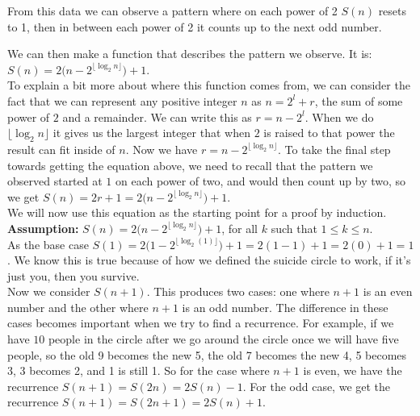 \documentclass[10pt, AMS Euler]{article}
\begin{document}
    \noindent From this data we can observe a pattern where on each power of 2 $S(n)$ resets to 1, then in between each power of 2 it counts up to the next odd number.

	\bigskip
	\noindent We can then make a function that describes the pattern we observe. It is: $S(n)=2\big(n-2^{\lfloor \log_2n\rfloor}\big)+1$.\\
    
    \noindent To explain a bit more about where this function comes from, we can consider the fact that we can represent any positive integer $n$ as $n=2^l+r$, the sum of some power of $2$ and a remainder. We can write this as $r=n-2^l$. When we do $\lfloor\log_2n\rfloor$ it gives us the largest integer that when $2$ is raised to that power the result can fit inside of $n$. Now we have $r=n-2^{\lfloor\log_2n\rfloor}$. To take the final step towards getting the equation above, we need to recall that the pattern we observed started at $1$ on each power of two, and would then count up by two, so we get $S(n)=2r+1=2\big(n-2^{\lfloor \log_2n\rfloor}\big)+1$.\\

    \noindent We will now use this equation as the starting point for a proof by induction.\\

    \noindent \textbf{Assumption:} $S(n)=2\big(n-2^{\lfloor \log_2n\rfloor}\big)+1$, for all $k$ such that $1\leq k \leq n$.\\

    \noindent As the base case $S(1)=2\big(1-2^{\lfloor \log_2(1)\rfloor}\big)+1=2(1-1)+1=2(0)+1=1$. We know this is true because of how we defined the suicide circle to work, if it's just you, then you survive.\\

    \noindent Now we consider $S(n+1)$. This produces two cases: one where $n+1$ is an even number and the other where $n+1$ is an odd number. The difference in these cases becomes important when we try to find a recurrence. For example, if we have $10$ people in the circle after we go around the circle once we will have five people, so the old 9 becomes the new 5, the old 7 becomes the new 4, 5 becomes 3, 3 becomes 2, and 1 is still 1. So for the case where $n+1$ is even, we have the recurrence $S(n+1)=S(2n)=2S(n)-1$. For the odd case, we get the recurrence $S(n+1)=S(2n+1)=2S(n)+1$.\\
\end{document}
